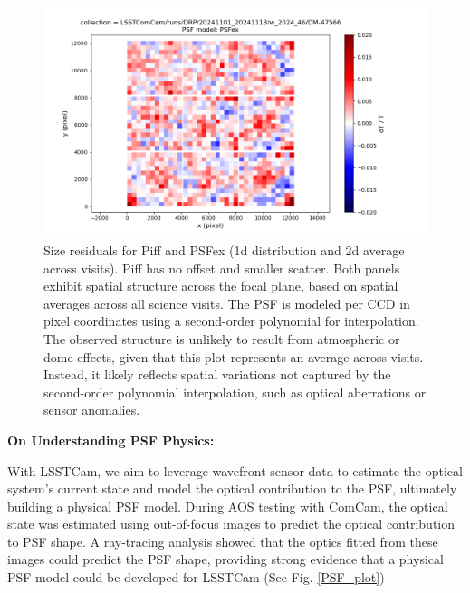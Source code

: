 \begin{figure}
	\includegraphics[scale=0.3]{figures/0_dT_2d_PSFex}
        \caption{\small Size residuals for Piff and PSFex (1d distribution and 2d average across visits). Piff has no offset and smaller scatter. Both panels 
        exhibit spatial structure across the focal plane, based on spatial averages across all science visits. The PSF is modeled per CCD in pixel coordinates 
        using a second-order polynomial for interpolation. The observed structure is unlikely to result from atmospheric or dome effects, given that this plot 
        represents an average across visits. Instead, it likely reflects spatial variations not captured by the second-order polynomial interpolation, such as 
        optical aberrations or sensor anomalies.}
        \label{DT_plot}
\end{figure}


\textbf{On Understanding PSF Physics:}


With LSSTCam, we aim to leverage wavefront sensor data to estimate the optical system's current state and model the optical contribution to the PSF, ultimately building a physical PSF model. During AOS testing with ComCam, the optical state was estimated using out-of-focus images to predict the optical contribution to PSF shape. A ray-tracing analysis showed that the optics fitted from these images could predict the PSF shape, providing strong evidence that a physical PSF model could be developed for LSSTCam (See  Fig. \ref{PSF_plot})


